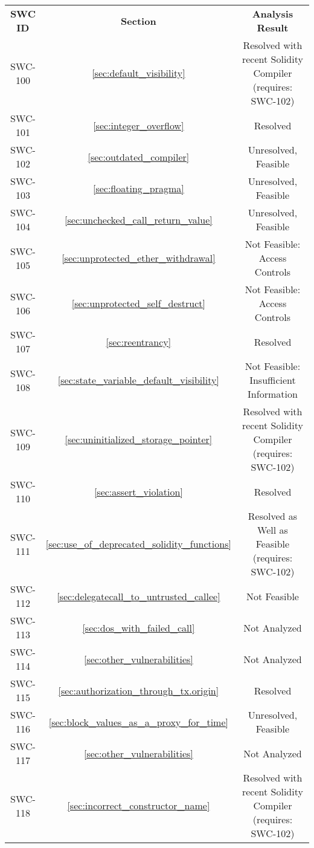 \begin{table}
    \begin{center}
        \begin{tabular}{ |c|c|c| } 
         \hline
         \textbf{SWC ID} & \textbf{Section} & \textbf{Analysis Result} \\
            SWC-100 & \ref{sec:default_visibility} & Resolved with recent Solidity Compiler (requires: SWC-102)\\
            SWC-101 & \ref{sec:integer_overflow} & Resolved\\
            SWC-102 & \ref{sec:outdated_compiler} & Unresolved, Feasible\\
            SWC-103 & \ref{sec:floating_pragma} & Unresolved, Feasible\\
            SWC-104 & \ref{sec:unchecked_call_return_value} & Unresolved, Feasible \\
            SWC-105 & \ref{sec:unprotected_ether_withdrawal} & Not Feasible: Access Controls\\
            SWC-106 & \ref{sec:unprotected_self_destruct} &  Not Feasible: Access Controls\\
            SWC-107 & \ref{sec:reentrancy} & Resolved \\
            SWC-108 & \ref{sec:state_variable_default_visibility} & Not Feasible: Insufficient Information\\
            SWC-109 & \ref{sec:uninitialized_storage_pointer} & Resolved with recent Solidity Compiler (requires: SWC-102)\\
            SWC-110 & \ref{sec:assert_violation} & Resolved \\
            SWC-111 & \ref{sec:use_of_deprecated_solidity_functions} & Resolved as Well as Feasible (requires: SWC-102)\\
            SWC-112 & \ref{sec:delegatecall_to_untrusted_callee} & Not Feasible \\
            SWC-113 & \ref{sec:dos_with_failed_call} & Not Analyzed \\
            SWC-114 & \ref{sec:other_vulnerabilities} & Not Analyzed \\
            SWC-115 & \ref{sec:authorization_through_tx.origin} & Resolved \\
            SWC-116 & \ref{sec:block_values_as_a_proxy_for_time} & Unresolved, Feasible \\
            SWC-117 & \ref{sec:other_vulnerabilities} & Not Analyzed \\
            SWC-118 & \ref{sec:incorrect_constructor_name} & Resolved with recent Solidity Compiler (requires: SWC-102)\\

\end{tabular}
\end{center}
\end{table}
